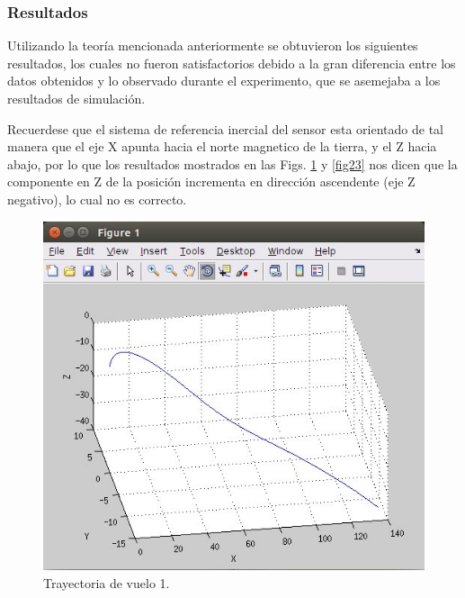 	\subsubsection{Resultados}

	Utilizando la teoría mencionada anteriormente se obtuvieron los siguientes resultados, los cuales no fueron satisfactorios debido a la gran diferencia entre los datos obtenidos y lo observado durante el experimento, que se asemejaba a los resultados de simulación.

	Recuerdese que el sistema de referencia inercial del sensor esta orientado de tal manera que el eje X apunta hacia el norte magnetico de la tierra, y el Z hacia abajo, por lo que los resultados mostrados en las Figs.  \ref{fig22} y \ref{fig23} nos dicen que la componente en Z de la posición incrementa en dirección ascendente (eje Z negativo), lo cual no es correcto.

		\begin{figure}[h]
		\begin{center}
		\includegraphics[scale=0.4]{imagenes/3-boomerang/tray_vue_1.jpg}
		\caption{Trayectoria de vuelo 1.}
		\label{fig22}
		\end{center}
		\end{figure}

